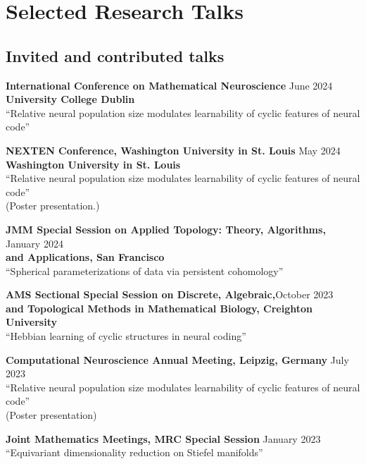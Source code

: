 \documentclass[10pt,letterpaper]{article}
\renewenvironment{itemize}{
  \begin{list}{}{
    \setlength{\leftmargin}{1.5em}
    \setlength{\itemsep}{0.25em}
    \setlength{\parskip}{0pt}
    \setlength{\parsep}{0.25em}
  }
}{
  \end{list}
}
\begin{document}
\section*{Selected Research Talks}


\subsection*{Invited and contributed talks}
\begin{itemize}

\item{\bf International Conference on Mathematical Neuroscience} \hfill June 2024\\
{\bf University College Dublin}\\
``Relative neural population size modulates learnability of cyclic features of neural code''

\item{\bf NEXTEN Conference, Washington University in St. Louis} \hfill May 2024\\
{\bf Washington University in St. Louis}\\
``Relative neural population size modulates learnability of cyclic features of neural code''\\
(Poster presentation.)


\item {\bf JMM Special Session on Applied Topology: Theory, Algorithms,} \hfill January 2024\\
{\bf and Applications, San Francisco} \\
``Spherical parameterizations of data via persistent cohomology''


\item {\bf AMS Sectional Special Session on Discrete, Algebraic,}\hfill October 2023 \\
{\bf and Topological Methods in Mathematical Biology, Creighton University} \\
``Hebbian learning of cyclic structures in neural coding''


\item {\bf Computational Neuroscience Annual Meeting, Leipzig, Germany} \hfill July 2023\\
``Relative neural population size modulates learnability of cyclic features of neural code''\\
(Poster presentation)

\item {\bf Joint Mathematics Meetings, MRC Special Session} \hfill January 2023\\
``Equivariant dimensionality reduction on Stiefel manifolds''



\end{itemize}
\end{document}
